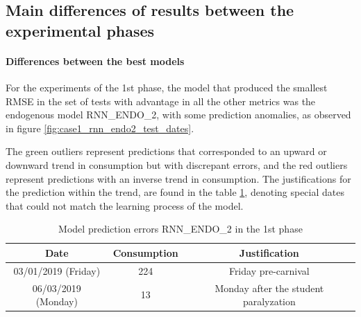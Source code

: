     \subsection{Main differences of results between the experimental phases}
        \paragraph{Differences between the best models}
        For the experiments of the 1st phase, the model that produced the smallest RMSE in the set of tests with advantage in all the other metrics was the endogenous model RNN\_ENDO\_2, with some prediction anomalies, as observed in figure \ref{fig:case1_rnn_endo2_test_dates}.
        \begin{figure}[H]
        \end{figure}
        The green outliers represent predictions that corresponded to an upward or downward trend in consumption but with discrepant errors, and the red outliers represent predictions with an inverse trend in consumption.
        The justifications for the prediction within the trend, are found in the table \ref{table:rnn_endo_2_green}, denoting special dates that could not match the learning process of the model.
            \begin{table}[!ht]
                \centering
                \caption{Model prediction errors RNN\_ENDO\_2 in the 1st phase}
                \label{table:rnn_endo_2_green}
                 \begin{tabular}{|c|c|c|}
                 \rowcolor{gray!50}
                 \hline 
                Date & Consumption & Justification\\ \hline    
                03/01/2019 (Friday)    & 224 & Friday pre-carnival\\
                06/03/2019 (Monday)  &  13 & Monday after the student paralyzation\\ \hline 
                \end{tabular} 
            \end{table}
            
